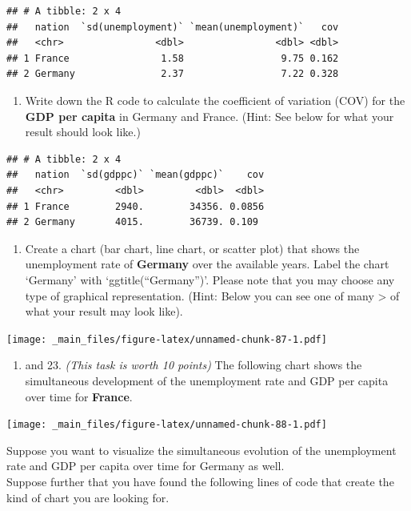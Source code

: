 \documentclass[
  12pt,
  oneside]{book}
\providecommand{\tightlist}{%
  \setlength{\itemsep}{0pt}\setlength{\parskip}{0pt}}
\theoremstyle{definition}
\theoremstyle{definition}
\theoremstyle{definition}
\theoremstyle{definition}
\theoremstyle{remark}
\begin{document}
\begin{verbatim}
## # A tibble: 2 x 4
##   nation  `sd(unemployment)` `mean(unemployment)`   cov
##   <chr>                <dbl>                <dbl> <dbl>
## 1 France                1.58                 9.75 0.162
## 2 Germany               2.37                 7.22 0.328
\end{verbatim}

\begin{enumerate}
\def\labelenumi{(\arabic{enumi})}
\setcounter{enumi}{19}
\tightlist
\item
  Write down the R code to calculate the coefficient of variation (COV) for the \textbf{GDP per capita}
  in Germany and France. (Hint: See below for what your result should look like.)
\end{enumerate}

\begin{verbatim}
## # A tibble: 2 x 4
##   nation  `sd(gdppc)` `mean(gdppc)`    cov
##   <chr>         <dbl>         <dbl>  <dbl>
## 1 France        2940.        34356. 0.0856
## 2 Germany       4015.        36739. 0.109
\end{verbatim}

\begin{enumerate}
\def\labelenumi{(\arabic{enumi})}
\setcounter{enumi}{20}
\tightlist
\item
  Create a chart (bar chart, line chart, or scatter plot) that shows the
  unemployment rate of \textbf{Germany} over the available years. Label the chart
  `Germany' with `ggtitle(``Germany'')'. Please note that you may choose any type of graphical representation.
  (Hint: Below you can see one of many \textbar\textgreater{} of what your result may look like).
\end{enumerate}

\texttt{[image: \_main\_files/figure-latex/unnamed-chunk-87-1.pdf]}

\begin{enumerate}
\def\labelenumi{(\arabic{enumi})}
\setcounter{enumi}{21}
\tightlist
\item
  and 23. \emph{(This task is worth 10 points)}
  The following chart shows the simultaneous development of the unemployment rate and GDP per capita over time for \textbf{France}.
\end{enumerate}

\texttt{[image: \_main\_files/figure-latex/unnamed-chunk-88-1.pdf]}

Suppose you want to visualize the simultaneous evolution of the unemployment rate and GDP per capita over time for Germany as well.\\
Suppose further that you have found the following lines of code that create the kind of chart you are looking for.
\end{document}
